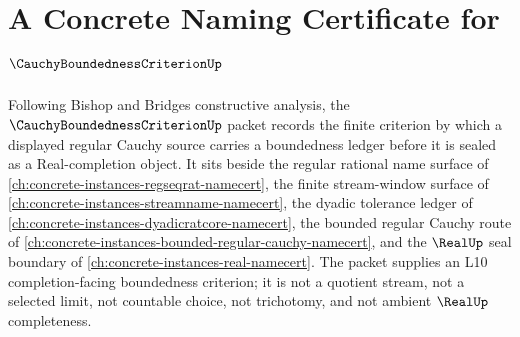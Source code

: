 \chapter{A Concrete Naming Certificate for $\CauchyBoundednessCriterionUp$}
\label{ch:concrete-instances-cauchy-boundedness-criterion-namecert}

Following Bishop and Bridges constructive analysis, the $\CauchyBoundednessCriterionUp$ packet records the finite criterion by which a displayed regular Cauchy source carries a boundedness ledger before it is sealed as a Real-completion object. It sits beside the regular rational name surface of \autoref{ch:concrete-instances-regseqrat-namecert}, the finite stream-window surface of \autoref{ch:concrete-instances-streamname-namecert}, the dyadic tolerance ledger of \autoref{ch:concrete-instances-dyadicratcore-namecert}, the bounded regular Cauchy route of \autoref{ch:concrete-instances-bounded-regular-cauchy-namecert}, and the $\RealUp$ seal boundary of \autoref{ch:concrete-instances-real-namecert}. The packet supplies an L10 completion-facing boundedness criterion; it is not a quotient stream, not a selected limit, not countable choice, not trichotomy, and not ambient $\RealUp$ completeness.

